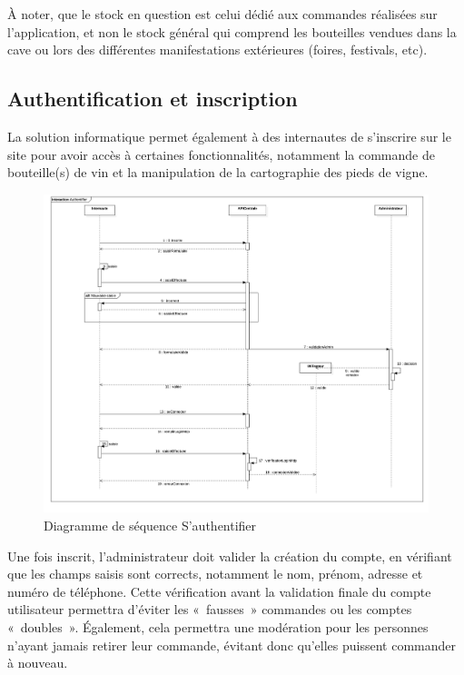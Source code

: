 \documentclass[a4paper, titlepage]{report}
\begin{document}
À noter, que le stock en question est celui dédié aux commandes
réalisées sur l'application, et non le stock général qui comprend les
bouteilles vendues dans la cave ou lors des différentes manifestations
extérieures (foires, festivals, etc).

\subsection{Authentification et inscription}\label{authentification-et-inscription}

La solution informatique permet également à des internautes de
s'inscrire sur le site pour avoir accès à certaines fonctionnalités,
notamment la commande de bouteille(s) de vin et la manipulation de la
cartographie des pieds de vigne.

\begin{figure}[!h]
\centering
\includegraphics{Images/SequenceDiagramAuthentifier.jpg}
\caption{Diagramme de séquence S'authentifier}
\end{figure}

Une fois inscrit, l'administrateur doit valider la création du compte,
en vérifiant que les champs saisis sont corrects, notamment le nom,
prénom, adresse et numéro de téléphone. Cette vérification avant la
validation finale du compte utilisateur permettra d'éviter les
«~fausses~» commandes ou les comptes «~doubles~». Également, cela
permettra une modération pour les personnes n'ayant jamais retirer leur
commande, évitant donc qu'elles puissent commander à nouveau.
\end{document}
